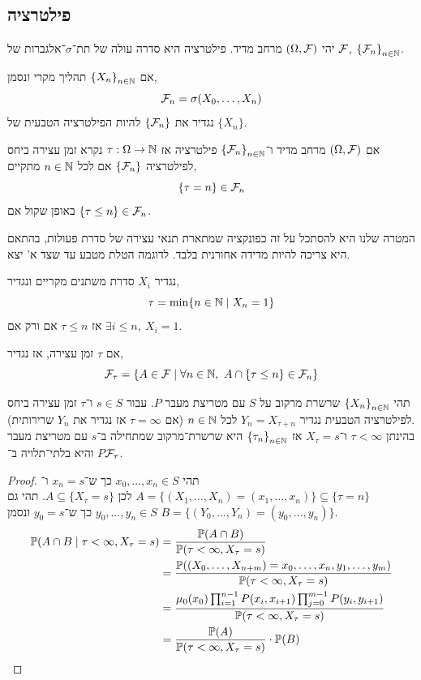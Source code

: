 \subsection{פילטרציה}
\begin{definition}[פילטרציה]
	יהי $(\Omega, \mathcal{F})$ מרחב מדיד.
	פילטרציה היא סדרה עולה של תת־$\sigma$־אלגברות של $\mathcal{F}$, ${\{ \mathcal{F}_n \}}_{n \in \mathbb{N}}$.
\end{definition}
\begin{definition}
	אם ${\{ X_n \}}_{n \in \mathbb{N}}$ תהליך מקרי ונסמן,
	\[
		\mathcal{F}_n = \sigma(X_0, \ldots, X_n)
	\]
	נגדיר את $\{ \mathcal{F}_n \}$ להיות הפילטרציה הטבעית של $\{ X_n \}$.
\end{definition}
\begin{definition}
	אם $(\Omega, \mathcal{F})$ מרחב מדיד ו־${\{ \mathcal{F}_n \}}_{n \in \mathbb{N}}$ פילטרציה אז $\tau : \Omega \to \mathbb{N}$ נקרא זמן עצירה ביחס לפילטרציה $\{ \mathcal{F}_n \}$ אם לכל $n \in \mathbb{N}$ מתקיים,
	\[
		\{ \tau = n \} \in \mathcal{F}_n
	\]
	באופן שקול אם $\{ \tau \le n \} \in \mathcal{F}_n$.
\end{definition}
המטרה שלנו היא להסתכל על זה כפונקציה שמתארת תנאי עצירה של סדרת פעולות, בהתאם היא צריכה להיות מדידה אחורנית בלבד.
לדוגמה הטלת מטבע עד שצד א' יצא.
\begin{example}
	נגדיר $X_i$ סדרת משתנים מקריים ונגדיר,
	\[
		\tau = \min\{ n \in \mathbb{N} \mid X_n = 1 \}
	\]
	אז $\tau \le n$ אם ורק אם $\exists i \le n,\ X_i = 1$.
\end{example}
\begin{definition}
	אם $\tau$ זמן עצירה, אז נגדיר,
	\[
		\mathcal{F}_{\tau}
		= \{ A \in \mathcal{F} \mid \forall n \in \mathbb{N},\ A \cap \{ \tau \le n \} \in \mathcal{F}_n \}
	\]
\end{definition}
\begin{theorem}
	תהי ${\{ X_n \}}_{n \in \mathbb{N}}$ שרשרת מרקוב על $S$ עם מטריצת מעבר $P$.
	עבור $s \in S$ ו־$\tau$ זמן עצירה ביחס לפילטרציה הטבעית נגדיר $Y_n = X_{\tau + n}$ לכל $n \in \mathbb{N}$ (אם $\tau = \infty$ אז נגדיר את $Y_n$ שרירותית). \\
	בהינתן $\tau < \infty$ ו־$X_{\tau} = s$ אז ${\{ \tau_n \}}_{n \in \mathbb{N}}$ היא שרשרת־מרקוב שמתחילה ב־$s$ עם מטריצת מעבר $P$ והיא בלתי־תלויה ב־$\mathcal{F}_{\tau}$.
\end{theorem}
\begin{proof}
	תהי $x_0, \ldots, x_n \in S$ כך ש־$x_n = s$ ו־$A = \{ (X_1, \ldots, X_n) = (x_1, \ldots, x_n) \} \subseteq \{ \tau = n \}$ לכן $A \subseteq \{ X_{\tau} = s \}$.
	תהי גם $y_0, \ldots, y_n \in S$ כך ש־$y_0 = s$ ונסמן $B = \{ (Y_0, \ldots, Y_n) = (y_0, \ldots, y_n) \}$.
	\begin{align*}
		\mathbb{P}(A \cap B \mid \tau < \infty, X_{\tau} = s)
		& = \frac{\mathbb{P}(A \cap B)}{\mathbb{P}(\tau < \infty, X_{\tau} = s)} \\
		& = \frac{\mathbb{P}((X_0, \ldots, X_{n + m}) = x_0, \ldots, x_n, y_1, \ldots, y_m)}{\mathbb{P}(\tau < \infty, X_{\tau} = s)} \\
		& = \frac{\mu_0(x_0) \prod_{i = 1}^{n - 1} P(x_i, x_{i + 1}) \prod_{j = 0}^{m - 1} P(y_i, y_{i + 1})}{\mathbb{P}(\tau < \infty, X_{\tau} = s)} \\
		& = \frac{\mathbb{P}(A)}{\mathbb{P}(\tau < \infty, X_{\tau} = s)} \cdot \mathbb{P}(B)
	\end{align*}
\end{proof}

